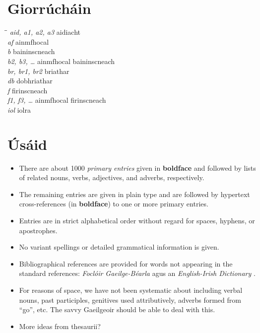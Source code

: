 \chapter*{Giorr\'uch\'ain} 
\begin{tabbing}
\hspace*{35ex}\=\hspace{25ex}\=\kill
\> {\it aid, a1, a2, a3} \> aidiacht \\
\> {\it af} \> ainmfhocal \\
\> {\it b} \> baininscneach \\
\> {\it b2, b3, \ldots} \> ainmfhocal baininscneach \\
\> {\it br, br1, br2} \> briathar \\
\> {\it db} \> dobhriathar \\
\> {\it f} \> firinscneach \\
\> {\it f1, f3, \ldots} \> ainmfhocal firinscneach \\
\> {\it iol} \> iolra \\
\end{tabbing}

\chapter*{{\'U}s\'aid} 

\begin{itemize}
\item There are about 1000 {\em primary entries} given in {\bf boldface}
and followed by lists of related nouns, verbs, adjectives, and
adverbs, respectively.  
\vspace{2ex}
\item The remaining entries are given in plain type and are followed by 
hypertext cross-references (in {\bf boldface}) to one or more primary entries.
\vspace{2ex}
\item Entries are in strict alphabetical order without regard for
spaces, hyphens, or apostrophes.
\vspace{2ex}
\item No variant spellings or detailed grammatical information is given.
\vspace{2ex}
\item Bibliographical references are provided for words not
appearing in the standard references: 
{\it Focl\'oir Gaeilge-B\'earla} \cite{OD77} agus
an {\it English-Irish Dictionary} \cite{Ba59}.
\vspace{2ex}
\item For reasons of space, we have not been systematic about including 
verbal nouns, 
past participles, genitives used attributively, adverbs formed from
``go'', etc.  The savvy Gaeilgeoir should be able to deal with this.
\vspace{2ex}
\item More ideas from thesaurii?
\end{itemize}
\endinput
